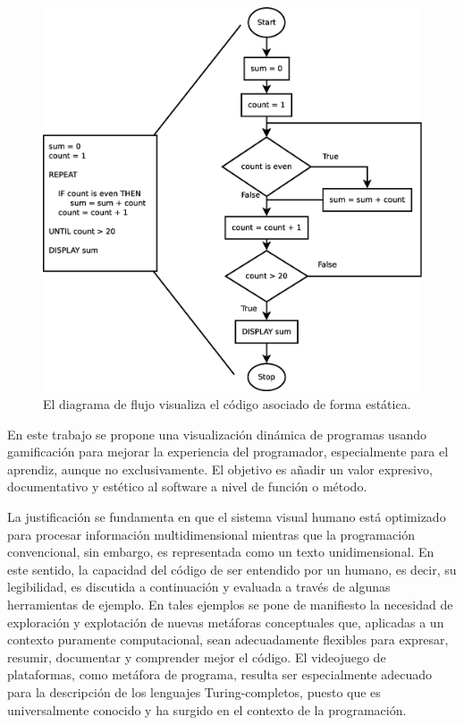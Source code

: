\documentclass{llncs}
\begin{document}
\begin{figure}[ht]
\begin{center}
\includegraphics[scale=0.25]{images/flowchart.eps}
\caption{El diagrama de flujo visualiza el código asociado de forma estática.
\label{fig:flowchart}}
\end{center}
\end{figure}

En este trabajo se propone una visualización dinámica de programas usando gamificación para mejorar la experiencia del programador, especialmente para el aprendiz, aunque no exclusivamente. El objetivo es añadir un valor expresivo, documentativo y estético al software a nivel de función o método. 

La justificación se fundamenta en que el sistema visual humano está optimizado para procesar información multidimensional mientras que la programación convencional, sin embargo, es representada como un texto unidimensional. En este sentido, la capacidad del código de ser entendido por un humano, es decir, su legibilidad, es discutida a continuación y evaluada a través de algunas herramientas de ejemplo. En tales ejemplos se pone de manifiesto la necesidad de exploración y explotación de nuevas metáforas conceptuales que, aplicadas a un contexto puramente computacional, sean adecuadamente flexibles para expresar, resumir, documentar y comprender mejor el código. El videojuego de plataformas, como metáfora de programa, resulta ser especialmente adecuado para la descripción de los lenguajes Turing-completos, puesto que es universalmente conocido y ha surgido en el contexto de la programación.
\end{document}
